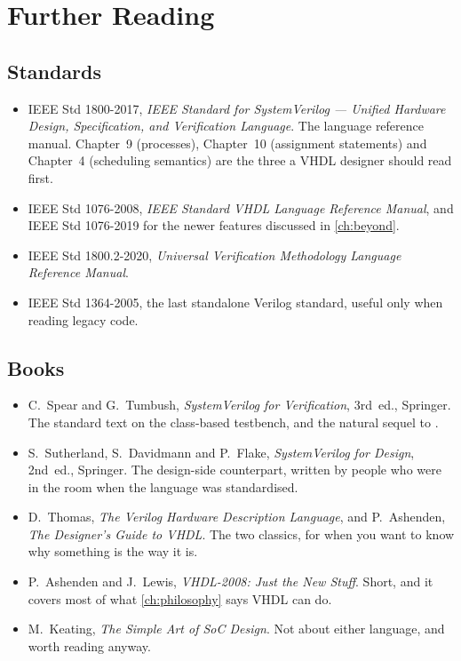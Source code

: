 \cleardoublepage
{}
{}
\chapter*{Further Reading}

\section*{Standards}

\begin{itemize}
  \item IEEE Std 1800-2017, \emph{IEEE Standard for SystemVerilog --- Unified
        Hardware Design, Specification, and Verification Language}. The
        language reference manual. Chapter~9 (processes), Chapter~10
        (assignment statements) and Chapter~4 (scheduling semantics) are the
        three a VHDL designer should read first.
  \item IEEE Std 1076-2008, \emph{IEEE Standard VHDL Language Reference
        Manual}, and IEEE Std 1076-2019 for the newer features discussed in
        \cref{ch:beyond}.
  \item IEEE Std 1800.2-2020, \emph{Universal Verification Methodology
        Language Reference Manual}.
  \item IEEE Std 1364-2005, the last standalone Verilog standard, useful only
        when reading legacy code.
\end{itemize}

\section*{Books}

\begin{itemize}
  \item C.~Spear and G.~Tumbush, \emph{SystemVerilog for Verification},
        3rd~ed., Springer. The standard text on the class-based testbench,
        and the natural sequel to .
  \item S.~Sutherland, S.~Davidmann and P.~Flake, \emph{SystemVerilog for
        Design}, 2nd~ed., Springer. The design-side counterpart, written by
        people who were in the room when the language was standardised.
  \item D.~Thomas, \emph{The Verilog Hardware Description Language}, and
        P.~Ashenden, \emph{The Designer's Guide to VHDL}. The two classics,
        for when you want to know why something is the way it is.
  \item P.~Ashenden and J.~Lewis, \emph{VHDL-2008: Just the New Stuff}.
        Short, and it covers most of what \cref{ch:philosophy} says VHDL can do.
  \item M.~Keating, \emph{The Simple Art of SoC Design}. Not about either
        language, and worth reading anyway.
\end{itemize}

